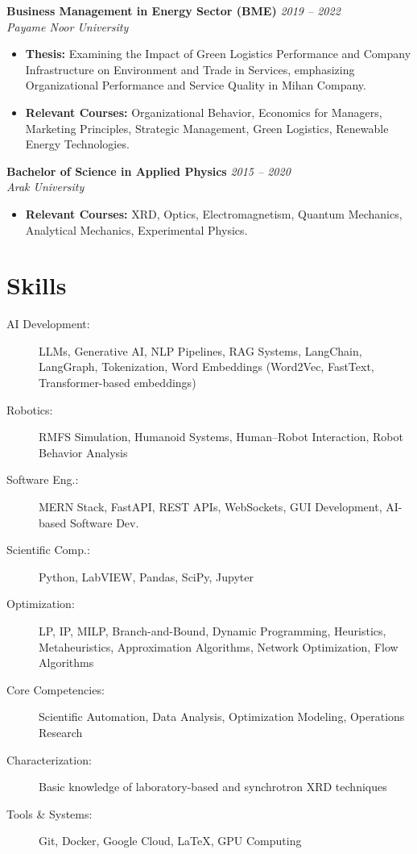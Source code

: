 \documentclass[10pt, a4paper]{article}
\begin{document}
\vspace{0.4em}

\textbf{Business Management in Energy Sector (BME)} \hfill \textit{2019 -- 2022} \\
\textit{Payame Noor University}
\begin{itemize}[label={}]
  \item \textbf{Thesis:} Examining the Impact of Green Logistics Performance and Company Infrastructure on Environment and Trade in Services, emphasizing Organizational Performance and Service Quality in Mihan Company.
  \item \textbf{Relevant Courses:} Organizational Behavior, Economics for Managers, Marketing Principles, Strategic Management, Green Logistics, Renewable Energy Technologies.
\end{itemize}

\vspace{0.4em}

\textbf{Bachelor of Science in Applied Physics} \hfill \textit{2015 -- 2020} \\
\textit{Arak University}
\begin{itemize}[label={}]
  \item \textbf{Relevant Courses:} XRD, Optics, Electromagnetism, Quantum Mechanics, Analytical Mechanics, Experimental Physics.
\end{itemize}

\section*{Skills}
\begin{description}
  \item[AI Development:] LLMs, Generative AI, NLP Pipelines, RAG Systems, LangChain, LangGraph, Tokenization, Word Embeddings (Word2Vec, FastText, Transformer-based embeddings)
  \item[Robotics:] RMFS Simulation, Humanoid Systems, Human--Robot Interaction, Robot Behavior Analysis
  \item[Software Eng.:] MERN Stack, FastAPI, REST APIs, WebSockets, GUI Development, AI-based Software Dev.
  \item[Scientific Comp.:] Python, LabVIEW, Pandas, SciPy, Jupyter
  \item[Optimization:] LP, IP, MILP, Branch-and-Bound, Dynamic Programming, Heuristics, Metaheuristics, Approximation Algorithms, Network Optimization, Flow Algorithms
  \item[Core Competencies:] Scientific Automation, Data Analysis, Optimization Modeling, Operations Research
  \item[Characterization:] Basic knowledge of laboratory-based and synchrotron XRD techniques
  \item[Tools \& Systems:] Git, Docker, Google Cloud, LaTeX, GPU Computing
\end{description}
\end{document}
